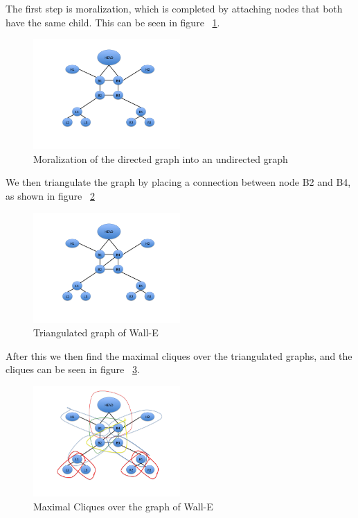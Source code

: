 \documentclass[paper=a4, fontsize=11pt]{scrartcl} %
\begin{document}
The first step is moralization, which is completed by attaching nodes that both have the same child.  This can be seen in figure ~\ref{fig:moralization}.

\begin{figure}
\centering
\includegraphics[width=0.5\textwidth]{Problem3/Slide1.png}
\caption{Moralization of the directed graph into an undirected graph}
\label{fig:moralization}
\end{figure}

We then triangulate the graph by placing a connection between node B2 and B4, as shown in figure ~\ref{fig:trig}

\begin{figure}
\centering
\includegraphics[width=0.5\textwidth]{Problem3/Slide2.png}
\caption{Triangulated graph of Wall-E}
\label{fig:trig}
\end{figure}

After this we then find the maximal cliques over the triangulated graphs, and the cliques can be seen in figure ~\ref{fig:clique}.

\begin{figure}
\centering
\includegraphics[width=0.5\textwidth]{Problem3/Slide3.png}
\caption{Maximal Cliques over the graph of Wall-E}
\label{fig:clique}
\end{figure}
\end{document}
